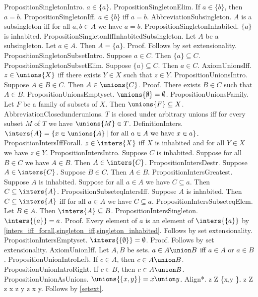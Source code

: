 PropositionSingletonIntro. $a \in \{a \}$.
PropositionSingletonElim. If $a \in \{b \}$, then $a = b$.
PropositionSingletonIff. $a \in \{b \}$ iff $a = b$.
AbbreviationSubsingleton. $A$ is a subsingleton iff for all $a, b \in A$ we have $a = b$.
PropositionSingletonInhabited. $ \{a \}$ is inhabited.
PropositionSingletonIffInhabitedSubsingleton. Let $A$ be a subsingleton. Let $a \in A$. Then $A = \{a \}$.
Proof. Follows by set extensionality.
PropositionSingletonSubsetIntro. Suppose $a \in C$. Then $ \{a \} \subseteq C$.
PropositionSingletonSubsetElim. Suppose $ \{a \} \subseteq C$. Then $a \in C$.
AxiomUnionsIff. $z \in \unions{X}$ iff there exists $Y \in X$ such that $z \in Y$.
PropositionUnionsIntro. Suppose $A \in B \in C$. Then $A \in \unions{C}$.
Proof. There exists $B \in C$ such that $A \in B$.
PropositionUnionsEmptyset. $ \unions{ \emptyset} = \emptyset$.
PropositionUnionsFamily. Let $F$ be a family of subsets of $X$. Then $ \unions{F} \subseteq X$.
AbbreviationClosedunderunions. $T$ is closed under arbitrary unions iff for every subset $M$ of $T$ we have $ \unions{M} \in T$.
DefinitionInters. $ \inters{A} = \{ x \in \unions{A} \mid \text{for all $a \in A$ we have $x \in a$} \}$.
PropositionIntersIffForall. $z \in \inters{X}$ iff $X$ is inhabited and for all $Y \in X$ we have $z \in Y$.
PropositionIntersIntro. Suppose $C$ is inhabited. Suppose for all $B \in C$ we have $A \in B$. Then $A \in \inters{C}$.
PropositionIntersDestr. Suppose $A \in \inters{C}$. Suppose $B \in C$. Then $A \in B$.
PropositionIntersGreatest. Suppose $A$ is inhabited. Suppose for all $a \in A$ we have $C \subseteq a$. Then $C \subseteq \inters{A}$.
PropositionSubseteqIntersIff. Suppose $A$ is inhabited. Then $C \subseteq \inters{A}$ iff for all $a \in A$ we have $C \subseteq a$.
PropositionIntersSubseteqElem. Let $B \in A$. Then $ \inters{A} \subseteq B$.
PropositionIntersSingleton. $ \inters{ \{a \}} = a$.
Proof. Every element of $a$ is an element of $ \inters{ \{a \}}$ by \cref{inters_iff_forall,singleton_iff,singleton_inhabited}. Follows by set extensionality.
PropositionIntersEmptyset. $ \inters{ \{ \emptyset \}} = \emptyset$.
Proof. Follows by set extensionality.
AxiomUnionIff. Let $A, B$ be sets. $a \in A \union B$ iff $a \in A$ or $a \in B$.
PropositionUnionIntroLeft. If $c \in A$, then $c \in A \union B$.
PropositionUnionIntroRight. If $c \in B$, then $c \in A \union B$.
PropositionUnionAsUnions. $ \unions{ \{x,y \}} = x \union y$.
Align*. z \in {} \iff \exists Z \in \{x,y \}. z \in Z \iff z \in x \lor z \in y \iff z \in x \union y. Follows by \cref{setext}. %
